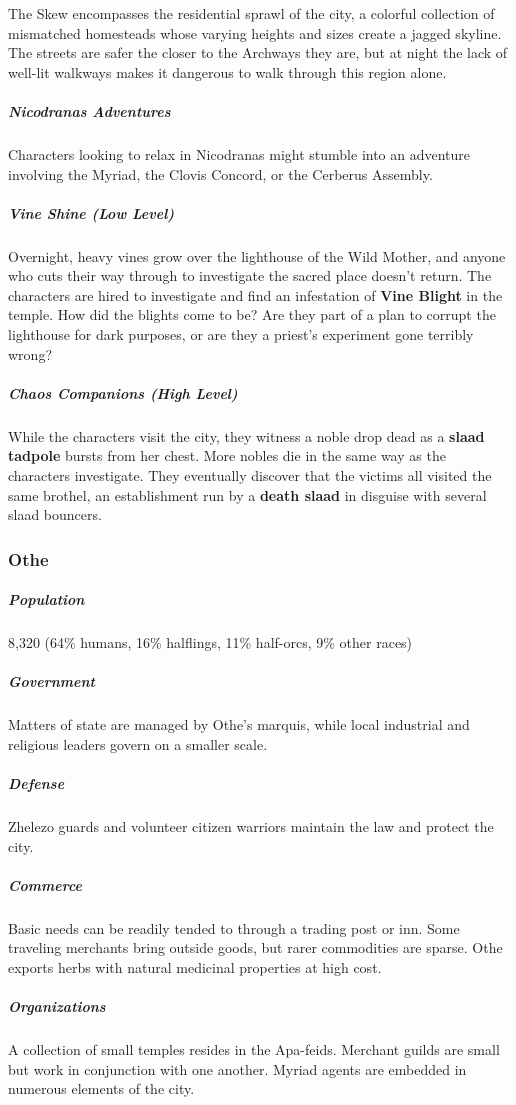 \documentclass[10pt,a4paper,twoside,bg=print,twocolumn,openany,nodeprecatedcode]{dndbook}
\begin{document}
The Skew encompasses the residential sprawl of the city, a colorful collection of mismatched homesteads whose varying heights and sizes create a jagged skyline. The streets are safer the closer to the Archways they are, but at night the lack of well-lit walkways makes it dangerous to walk through this region alone.

\subparagraph{Nicodranas Adventures}
Characters looking to relax in Nicodranas might stumble into an adventure involving the Myriad, the Clovis Concord, or the Cerberus Assembly.

\subparagraph{Vine Shine (Low Level)}
Overnight, heavy vines grow over the lighthouse of the Wild Mother, and anyone who cuts their way through to investigate the sacred place doesn't return. The characters are hired to investigate and find an infestation of \textbf{Vine Blight} in the temple. How did the blights come to be? Are they part of a plan to corrupt the lighthouse for dark purposes, or are they a priest's experiment gone terribly wrong?

\subparagraph{Chaos Companions (High Level)}
While the characters visit the city, they witness a noble drop dead as a \textbf{slaad tadpole} bursts from her chest. More nobles die in the same way as the characters investigate. They eventually discover that the victims all visited the same brothel, an establishment run by a \textbf{death slaad} in disguise with several slaad bouncers.

\subsubsection{Othe}
\subparagraph{Population}
8,320 (64\% humans, 16\% halflings, 11\% half-orcs, 9\% other races)

\subparagraph{Government}
Matters of state are managed by Othe's marquis, while local industrial and religious leaders govern on a smaller scale.

\subparagraph{Defense}
Zhelezo guards and volunteer citizen warriors maintain the law and protect the city.

\subparagraph{Commerce}
Basic needs can be readily tended to through a trading post or inn. Some traveling merchants bring outside goods, but rarer commodities are sparse. Othe exports herbs with natural medicinal properties at high cost.

\subparagraph{Organizations}
A collection of small temples resides in the Apa-feids. Merchant guilds are small but work in conjunction with one another. Myriad agents are embedded in numerous elements of the city.
\end{document}
